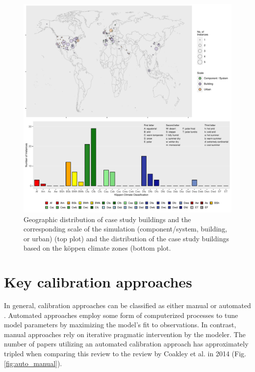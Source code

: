 \documentclass[review]{elsarticle}
\begin{document}
\begin{figure}[!h]
\centering
\includegraphics[width=1.1\textwidth]{figures/map_climate.pdf}
\caption{Geographic distribution of case study buildings and the corresponding scale of the simulation (component/system, building, or urban) (top plot) and the distribution of the case study buildings based on the k\"{o}ppen climate zones (bottom plot.}
\label{fig:map_climate}
\end{figure}


\section{Key calibration approaches} \label{sec:calib_approach}

In general, calibration approaches can be classified as either manual or automated \cite{coakley2014review}. Automated approaches employ some form of computerized processes to tune model parameters by maximizing the model's fit to observations. In contrast, manual approaches rely on iterative pragmatic intervention by the modeler. The number of papers utilizing an automated calibration approach has approximately tripled when comparing this review to the review by Coakley et al. \cite{coakley2014review} in 2014 (Fig. \ref{fig:auto_manual}).
\end{document}
